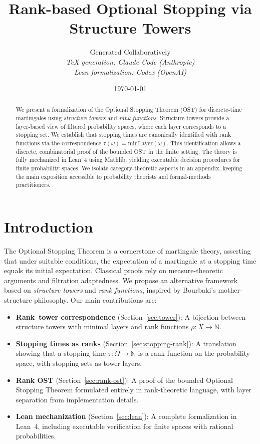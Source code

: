 \documentclass[11pt]{article}
\title{Rank-based Optional Stopping via Structure Towers}
\author{%
  Generated Collaboratively\\
  \small\textit{TeX generation: Claude Code (Anthropic)}\\
  \small\textit{Lean formalization: Codex (OpenAI)}%
}
\date{\today}
\theoremstyle{definition}
\theoremstyle{remark}
\newcommand{\minLayer}{\mathrm{minLayer}}
\newcommand{\NN}{\mathbb{N}}
\begin{document}
\maketitle

\begin{abstract}
We present a formalization of the Optional Stopping Theorem (OST) for discrete-time martingales using \emph{structure towers} and \emph{rank functions}.
Structure towers provide a layer-based view of filtered probability spaces, where each layer corresponds to a stopping set.
We establish that stopping times are canonically identified with rank functions via the correspondence $\tau(\omega) = \minLayer(\omega)$.
This identification allows a discrete, combinatorial proof of the bounded OST in the finite setting.
The theory is fully mechanized in Lean~4 using Mathlib, yielding executable decision procedures for finite probability spaces.
We isolate category-theoretic aspects in an appendix, keeping the main exposition accessible to probability theorists and formal-methods practitioners.
\end{abstract}

\section{Introduction}
\label{sec:intro}

The Optional Stopping Theorem is a cornerstone of martingale theory, asserting that under suitable conditions, the expectation of a martingale at a stopping time equals its initial expectation.
Classical proofs rely on measure-theoretic arguments and filtration adaptedness.
We propose an alternative framework based on \emph{structure towers} and \emph{rank functions}, inspired by Bourbaki's mother-structure philosophy.
Our main contributions are:

\begin{itemize}
\item \textbf{Rank--tower correspondence} (Section~\ref{sec:tower}): A bijection between structure towers with minimal layers and rank functions $\rho: X \to \NN$.
\item \textbf{Stopping times as ranks} (Section~\ref{sec:stopping-rank}): A translation showing that a stopping time $\tau: \Omega \to \NN$ is a rank function on the probability space, with stopping sets as tower layers.
\item \textbf{Rank OST} (Section~\ref{sec:rank-ost}): A proof of the bounded Optional Stopping Theorem formulated entirely in rank-theoretic language, with layer separation from implementation details.
\item \textbf{Lean mechanization} (Section~\ref{sec:lean}): A complete formalization in Lean~4, including executable verification for finite spaces with rational probabilities.
\end{itemize}
\end{document}
